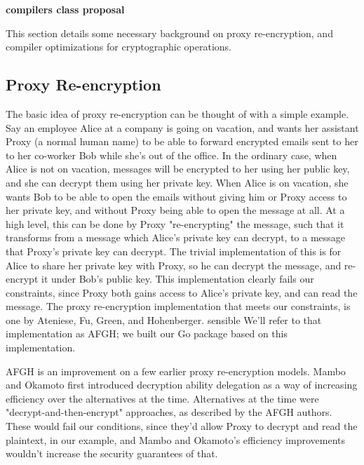 \textbf{compilers class proposal}

This section details some necessary background on proxy re-encryption, and compiler optimizations for cryptographic operations.

\subsection{Proxy Re-encryption}
\label{sec:pre}
The basic idea of proxy re-encryption can be thought of with a simple example.
Say an employee Alice at a company is going on vacation, and wants her assistant Proxy (a normal human name) to be able to forward encrypted emails sent to her to her co-worker Bob while she's out of the office.
In the ordinary case, when Alice is not on vacation, messages will be encrypted to her using her public key, and she can decrypt them using her private key.
When Alice is on vacation, she wants Bob to be able to open the emails without giving him or Proxy access to her private key, and without Proxy being able to open the message at all.
At a high level, this can be done by Proxy "re-encrypting" the message, such that it transforms from a message which Alice's private key can decrypt, to a message that Proxy's private key can decrypt.
The trivial implementation of this is for Alice to share her private key with Proxy, so he can decrypt the message, and re-encrypt it under Bob's public key.
This implementation clearly fails our constraints, since Proxy both gains access to Alice's private key, and can read the message.
The proxy re-encryption implementation that meets our constraints, is one by Ateniese, Fu, Green, and Hohenberger. 
\cite{afgh}sensible
We'll refer to that implementation as AFGH; we built our Go package based on this implementation.
\cite{noauthor_etclabpre_nodate}

AFGH is an improvement on a few earlier proxy re-encryption models.
Mambo and Okamoto first introduced decryption ability delegation as a way of increasing efficiency over the alternatives at the time.
\cite{mambo_okamoto}
Alternatives at the time were "decrypt-and-then-encrypt" approaches, as described by the AFGH authors.
\cite{afgh}
These would fail our conditions, since they'd allow Proxy to decrypt and read the plaintext, in our example, and Mambo and Okamoto's efficiency improvements wouldn't increase the security guarantees of that. 


